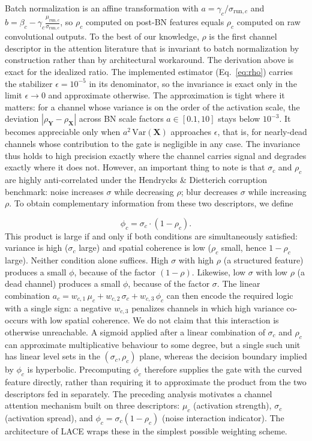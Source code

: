 \documentclass{bmvc2k}
\begin{document}
Batch normalization is an affine transformation with $a = \gamma_c/\sigma_{\text{run},c}$ and $b = \beta_c - \gamma_c\frac{\mu_{\text{run},c}}{\sigma_{\text{run},c}}$, so $\rho_c$ computed on post-BN features equals $\rho_c$ computed on raw convolutional outputs. To the best of our knowledge, $\rho$ is the first channel descriptor in the attention literature that is invariant to batch normalization by construction rather than by architectural workaround.  The derivation above is exact for the idealized ratio. The implemented estimator (Eq.~\ref{eq:rho}) carries the stabilizer $\epsilon = 10^{-5}$ in its denominator, so the invariance is exact only in the limit $\epsilon \to 0$ and approximate otherwise. The approximation is tight where it matters: for a channel whose variance is on the order of the activation scale, the deviation $|\rho_{\mathbf{Y}} - \rho_{\mathbf{X}}|$ across BN scale factors $a \in [0.1, 10]$ stays below $10^{-3}$. It becomes appreciable only when $a^2\,\mathrm{Var}(\mathbf{X})$ approaches $\epsilon$, that is, for nearly-dead channels whose contribution to the gate is negligible in any case. The invariance thus holds to high precision exactly where the channel carries signal and degrades exactly where it does not. However, an important thing to note is that $\sigma_c$ and $\rho_c$ are highly anti-correlated under the Hendrycks \& Dietterich corruption benchmark: noise increases $\sigma$ while decreasing $\rho$; blur decreases $\sigma$ while increasing $\rho$. To obtain complementary information from these two descriptors, we define 

\begin{equation}\label{eq:phi}
    \phi_c = \sigma_c \cdot (1 - \rho_c).
\end{equation}
This product is large if and only if both conditions are simultaneously satisfied: variance is high ($\sigma_c$ large) and spatial coherence is low ($\rho_c$ small, hence $1 - \rho_c$ large). Neither condition alone suffices. High $\sigma$ with high $\rho$ (a structured feature) produces a small $\phi$, because of the factor $(1- \rho)$. Likewise, low $\sigma$ with low $\rho$ (a dead channel) produces a small $\phi$, because of the factor $\sigma$. The linear combination $a_c = w_{c,1}\,\mu_c + w_{c,2}\,\sigma_c + w_{c,3}\,\phi_c$ can then encode the required logic with a single sign: a negative $w_{c,3}$ penalizes channels in which high variance co-occurs with low spatial coherence. We do not claim that this interaction is otherwise unreachable. A sigmoid applied after a linear combination of $\sigma_c$ and $\rho_c$ can approximate multiplicative behaviour to some degree, but a single such unit has linear level sets in the $(\sigma_c, \rho_c)$ plane, whereas the decision boundary implied by $\phi_c$ is hyperbolic. Precomputing $\phi_c$ therefore supplies the gate with the curved feature directly, rather than requiring it to approximate the product from the two descriptors fed in separately. The preceding analysis motivates a channel attention mechanism built on three descriptors: $\mu_c$ (activation strength), $\sigma_c$ (activation spread), and $\phi_c = \sigma_c(1-\rho_c)$ (noise interaction indicator). The architecture of LACE wraps these in the simplest possible weighting scheme.
\end{document}

